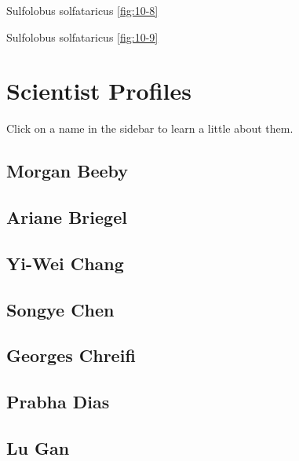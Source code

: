 \documentclass[]{tufte-book}
\begin{document}
Sulfolobus solfataricus \ref{fig:10-8}

Sulfolobus solfataricus \ref{fig:10-9}

\hypertarget{scientist-profiles}{%
\chapter{Scientist Profiles}\label{scientist-profiles}}

Click on a name in the sidebar to learn a little about them.

\hypertarget{morgan_beeby}{%
\section*{Morgan Beeby}\label{morgan_beeby}}

\hypertarget{ariane_briegel}{%
\section*{Ariane Briegel}\label{ariane_briegel}}

\hypertarget{yi-wei_chang}{%
\section*{Yi-Wei Chang}\label{yi-wei_chang}}

\hypertarget{songye_chen}{%
\section*{Songye Chen}\label{songye_chen}}

\hypertarget{georges_chreifi}{%
\section*{Georges Chreifi}\label{georges_chreifi}}

\hypertarget{prabha_dias}{%
\section*{Prabha Dias}\label{prabha_dias}}

\hypertarget{lu_gan}{%
\section*{Lu Gan}\label{lu_gan}}
\end{document}
